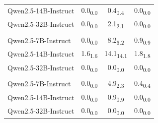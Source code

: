 \begin{table}[t]
{\begin{tabular}{l ccc}
Qwen2.5-14B-Instruct & 0.0\textsubscript{0.0} & 0.4\textsubscript{0.4} & 0.0\textsubscript{0.0} \\
Qwen2.5-32B-Instruct & 0.0\textsubscript{0.0} & 2.1\textsubscript{2.1} & 0.0\textsubscript{0.0} \\
\addlinespace
\multicolumn{4}{l}{\textit{\textbf{MMLU-Stem}}} \\
Qwen2.5-7B-Instruct & 0.0\textsubscript{0.0} & 8.2\textsubscript{6.2} & 0.9\textsubscript{0.9} \\
Qwen2.5-14B-Instruct & 1.6\textsubscript{1.6} & 14.1\textsubscript{14.1} & 1.8\textsubscript{1.8} \\
Qwen2.5-32B-Instruct & 0.0\textsubscript{0.0} & 0.0\textsubscript{0.0} & 0.0\textsubscript{0.0} \\
\addlinespace
\multicolumn{4}{l}{\textit{\textbf{MMLU-HSS}}} \\
Qwen2.5-7B-Instruct & 0.0\textsubscript{0.0} & 4.9\textsubscript{2.3} & 0.4\textsubscript{0.4} \\
Qwen2.5-14B-Instruct & 0.0\textsubscript{0.0} & 0.9\textsubscript{0.9} & 0.0\textsubscript{0.0} \\
Qwen2.5-32B-Instruct & 0.0\textsubscript{0.0} & 0.0\textsubscript{0.0} & 0.0\textsubscript{0.0} \\
\bottomrule
\end{tabular}%
}
\end{table}
